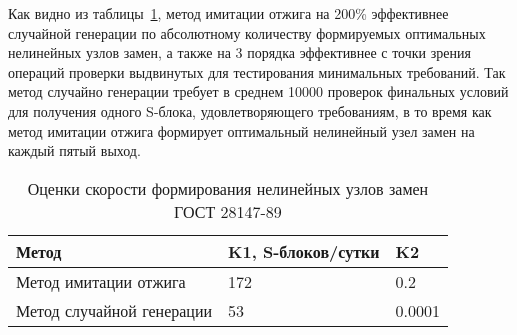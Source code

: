 Как видно из таблицы~\ref{table:speedtest_GOST_annealing}, метод имитации отжига на 200\%
эффективнее случайной генерации по абсолютному количеству формируемых
оптимальных нелинейных узлов замен, а также на 3 порядка эффективнее с точки
зрения операций проверки выдвинутых для тестирования минимальных требований. Так
метод случайно генерации требует в среднем 10000 проверок финальных условий для
получения одного S-блока, удовлетворяющего требованиям, в то время как метод
имитации отжига формирует оптимальный нелинейный узел замен на каждый пятый
выход.

\begin{table}
    \caption{Оценки скорости формирования нелинейных узлов замен ГОСТ 28147-89}
    \label{table:speedtest_GOST_annealing}
    \begin{tabular}{| m{7.7cm} | m{4cm} | m{4cm} |}
        \hline
        Метод                       & K1, \newline S-блоков/сутки    & K2        \\ \hline
        Метод имитации отжига       & 172                   & 0.2       \\ \hline
        Метод случайной генерации   & 53                    & 0.0001    \\ \hline
    \end{tabular}
\end{table}

